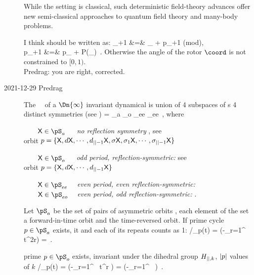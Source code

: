 \begin{description}
{While the setting is classical,
such deterministic field-theory advances offer new semi-classical
approaches to quantum field theory and many-body problems.

    }

     {
I think  should be written as:
\bea
\coord_{\zeit+1} &=& \coord_{\zeit} + p_{\zeit+1} \qquad  (\mbox{mod}), \\
p_{\zeit+1} &=& p_{\zeit} + P(\coord_{\zeit}) \,.
\eea
Otherwise the angle of the rotor $\coord$ is not constrained to $[0,1)$.
\\Predrag: you are right, corrected.
}

\bigskip\bigskip
\item[2021-12-29 Predrag]

The \statesp\ \pS\ of a $\Dn{\infty}$ invariant dynamical is union of
4 subspaces of {\lattstate}s 4 distinct symmetries
(see )
\beq
\pS = \pS_{a} \cup \pS_{o} \cup \pS_{ee} \cup \pS_{ee}
\,,
where

\noindent
$\qquad \Xx\in\pS_{a}\quad\;$
    {\em no reflection symmetry} ,
                                 see 
\\ \qquad\qquad\qquad
orbit $p=\{\mathsf{X}, d\mathsf{X}, \cdots, d_{{||}-1}\mathsf{X},
       \sigma\mathsf{X}, \sigma_1\mathsf{X}, \cdots, \sigma_{{||}-1}\mathsf{X}\}$

\noindent
$\qquad \Xx\in\pS_{o}\quad\;$
    {\em odd period, reflection-symmetric:} 
                                            see 
\\ \qquad\qquad\qquad
orbit $p=\{\mathsf{X}, d\mathsf{X}, \cdots, d_{{||}-1}\mathsf{X}\}$

\noindent
$\qquad \Xx\in\pS_{ee}\quad$
    {\em even period, even reflection-symmetric:} 
\\

\noindent
$\qquad \Xx\in\pS_{eo}\quad$
    {\em even period, odd reflection-symmetric:} .

Let $\pS_{a}$ be the set of pairs of asymmetric orbits
 , each element of
the set a forward-in-time orbit and the time-reversed orbit.
If prime cycle $p \in \pS_{a}$ exists, it and each of its repeats counts
as 1:
/\zeta_{p}(t) =
\exp \Big(-\sum_{r=1}^{\infty} \, t^{2r}\Big)
    =
\,.

prime {\lattstate} $p \in \pS_{o}$ exists,
{\lattstate} invariant under the dihedral group $H_{{||},k}$, ${|p|}$
values of $k$
/\zeta_{p}(t) =
\exp \Big(-\sum_{r=1}^{\infty} \,
                     t^{r}
      \Big) =
\exp \Big(-\sum_{r=1}^{\infty} \,
      \Big)
\,.


\end{description}
